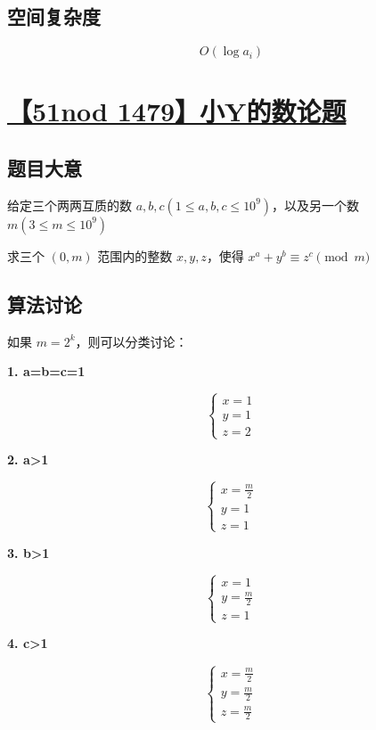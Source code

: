 \documentclass[UTF8]{article}
\begin{document}
\subsection{空间复杂度}

$$
O(\log a_i)
$$


\section{\href{http://www.51nod.com/Challenge/Problem.html?problemId=1479}{【51nod 1479】小Y的数论题}}
\subsection{题目大意}

给定三个两两互质的数 $a, b, c(1 \le a, b, c \le 10^9)$，以及另一个数 $m(3 \le m \le 10^9)$

求三个 $(0, m)$ 范围内的整数 $x, y, z$，使得 $x^a+y^b \equiv z^c \pmod {m}$

\subsection{算法讨论}

如果 $m = 2^k$，则可以分类讨论：

\textbf{1. a=b=c=1}

$$
\begin{cases}
x=1 \\
y=1 \\
z=2
\end{cases}
$$

\textbf{2. a>1}

$$
\begin{cases}
x=\frac{m}{2} \\
y=1 \\
z=1
\end{cases}
$$

\textbf{3. b>1}

$$
\begin{cases}
x=1 \\
y=\frac{m}{2} \\
z=1
\end{cases}
$$

\textbf{4. c>1}

$$
\begin{cases}
x=\frac{m}{2} \\
y=\frac{m}{2} \\
z=\frac{m}{2}
\end{cases}
$$
\end{document}
